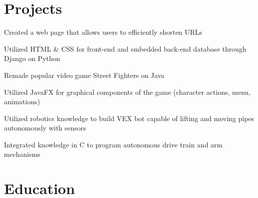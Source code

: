 \documentclass[]{deedy-resume-openfont}
\begin{document}
\section{Projects}
\begin{tightemize}
\item Created a web page that allows users to efficiently shorten URLs
\item Utilized HTML \& CSS for front-end and embedded back-end database through Django on Python
\end{tightemize}


\sectionsep
{}
\begin{tightemize}
\item Remade popular video game Street Fighters on Java
\item Utilized JavaFX for graphical components of the game (character actions, menu, animations)
\end{tightemize}
\sectionsep
 
\begin{tightemize}
\item Utilized robotics knowledge to build VEX bot capable of lifting and moving pipes autonomously with sensors
\item Integrated knowledge in C to program autonomous drive train and arm mechanisms 
\end{tightemize}
\sectionsep

\section{Education}
\sectionsep


\sectionsep
\end{document}

